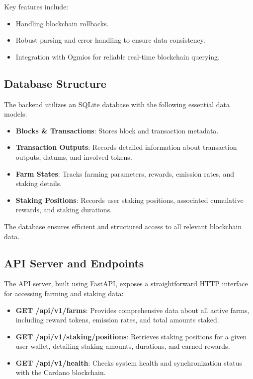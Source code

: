 \documentclass{article}
\begin{document}
Key features include:
\begin{itemize}
    \item Handling blockchain rollbacks.
    \item Robust parsing and error handling to ensure data consistency.
    \item Integration with Ogmios for reliable real-time blockchain querying.
\end{itemize}

\subsection{Database Structure}
The backend utilizes an SQLite database with the following essential data models:

\begin{itemize}
    \item \textbf{Blocks \& Transactions}: Stores block and transaction metadata.
    \item \textbf{Transaction Outputs}: Records detailed information about transaction outputs, datums, and involved tokens.
    \item \textbf{Farm States}: Tracks farming parameters, rewards, emission rates, and staking details.
    \item \textbf{Staking Positions}: Records user staking positions, associated cumulative rewards, and staking durations.
\end{itemize}

The database ensures efficient and structured access to all relevant blockchain data.

\subsection{API Server and Endpoints}
The API server, built using FastAPI, exposes a straightforward HTTP interface for accessing farming and staking data:

\begin{itemize}
    \item \textbf{GET /api/v1/farms}: Provides comprehensive data about all active farms, including reward tokens, emission rates, and total amounts staked.
    \item \textbf{GET /api/v1/staking/positions}: Retrieves staking positions for a given user wallet, detailing staking amounts, durations, and earned rewards.
    \item \textbf{GET /api/v1/health}: Checks system health and synchronization status with the Cardano blockchain.
\end{itemize}
\end{document}
